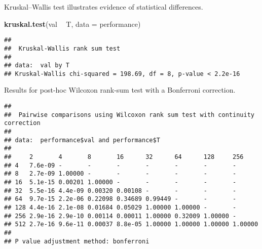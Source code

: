 \documentclass[]{book}
\newenvironment{Shaded}{\begin{snugshade}}{\end{snugshade}}
\newcommand{\DataTypeTok}[1]{\textcolor[rgb]{0.13,0.29,0.53}{#1}}
\newcommand{\KeywordTok}[1]{\textcolor[rgb]{0.13,0.29,0.53}{\textbf{#1}}}
\newcommand{\NormalTok}[1]{#1}
\newcommand{\OperatorTok}[1]{\textcolor[rgb]{0.81,0.36,0.00}{\textbf{#1}}}
\newcommand{\OtherTok}[1]{\textcolor[rgb]{0.56,0.35,0.01}{#1}}
\newcommand{\StringTok}[1]{\textcolor[rgb]{0.31,0.60,0.02}{#1}}
\begin{document}
Kruskal--Wallis test illustrates evidence of statistical differences.

\begin{Shaded}
\begin{Highlighting}[]
\KeywordTok{kruskal.test}\NormalTok{(val }\OperatorTok{~}\StringTok{ }\NormalTok{T, }\DataTypeTok{data =}\NormalTok{ performance)}
\end{Highlighting}
\end{Shaded}

\begin{verbatim}
## 
##  Kruskal-Wallis rank sum test
## 
## data:  val by T
## Kruskal-Wallis chi-squared = 198.69, df = 8, p-value < 2.2e-16
\end{verbatim}

Results for post-hoc Wilcoxon rank-sum test with a Bonferroni correction.

\begin{Shaded}
\end{Shaded}

\begin{verbatim}
## 
##  Pairwise comparisons using Wilcoxon rank sum test with continuity correction 
## 
## data:  performance$val and performance$T 
## 
##     2       4       8       16      32      64      128     256    
## 4   7.6e-09 -       -       -       -       -       -       -      
## 8   2.7e-09 1.00000 -       -       -       -       -       -      
## 16  5.1e-15 0.00201 1.00000 -       -       -       -       -      
## 32  5.5e-16 4.4e-09 0.00320 0.00108 -       -       -       -      
## 64  9.7e-15 2.2e-06 0.22098 0.34689 0.99449 -       -       -      
## 128 4.4e-16 2.1e-08 0.01684 0.05029 1.00000 1.00000 -       -      
## 256 2.9e-16 2.9e-10 0.00114 0.00011 1.00000 0.32009 1.00000 -      
## 512 2.7e-16 9.6e-11 0.00037 8.8e-05 1.00000 1.00000 1.00000 1.00000
## 
## P value adjustment method: bonferroni
\end{verbatim}
\end{document}
